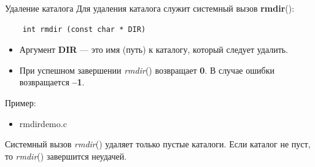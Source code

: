 \documentclass[xcolor=table]{beamer}
\begin{document}
\begin{frame}[fragile]{Удаление каталога}
	Для удаления каталога служит системный вызов \textbf{rmdir}():
	\begin{verbatim}
	int rmdir (const char * DIR)
	\end{verbatim}
	\begin{itemize}
		\item Аргумент \textbf{DIR} — это имя (путь) к каталогу, который следует удалить.
		\item При успешном завершении \textit{rmdir}() возвращает \textbf{0}. В случае ошибки возвращается \textbf{–1}. 
	\end{itemize}
	Пример: 
	\begin{itemize}
		\item rmdirdemo.c
	\end{itemize}
	Системный вызов \textit{rmdir}() удаляет только пустые каталоги. Если каталог не пуст, то \textit{rmdir}() завершится неудачей.
\end{frame}
\end{document}
